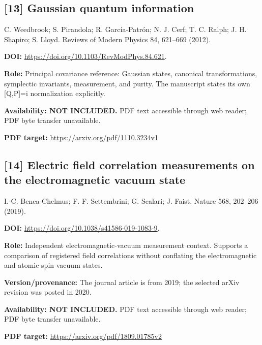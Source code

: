 \documentclass[11pt,a4paper]{article}
\begin{document}
\begin{minipage}{\textwidth}
\subsection*{[13] Gaussian quantum information}
C. Weedbrook; S. Pirandola; R. Garc\'ia-Patr\'on; N. J. Cerf; T. C. Ralph; J. H. Shapiro; S. Lloyd. Reviews of Modern Physics 84, 621--669 (2012).

\textbf{DOI:} \url{https://doi.org/10.1103/RevModPhys.84.621}.

\textbf{Role:} Principal covariance reference: Gaussian states, canonical transformations, symplectic invariants, measurement, and purity. The manuscript states its own [Q,P]=i normalization explicitly.

\textbf{Availability: NOT INCLUDED.} PDF text accessible through web reader; PDF byte transfer unavailable.\par
\textbf{PDF target:} \url{https://arxiv.org/pdf/1110.3234v1}
\end{minipage}
\par\medskip
\begin{minipage}{\textwidth}
\subsection*{[14] Electric field correlation measurements on the electromagnetic vacuum state}
I.-C. Benea-Chelmus; F. F. Settembrini; G. Scalari; J. Faist. Nature 568, 202--206 (2019).

\textbf{DOI:} \url{https://doi.org/10.1038/s41586-019-1083-9}.

\textbf{Role:} Independent electromagnetic-vacuum measurement context. Supports a comparison of registered field correlations without conflating the electromagnetic and atomic-spin vacuum states.

\textbf{Version/provenance:} The journal article is from 2019; the selected arXiv revision was posted in 2020.

\textbf{Availability: NOT INCLUDED.} PDF text accessible through web reader; PDF byte transfer unavailable.\par
\textbf{PDF target:} \url{https://arxiv.org/pdf/1809.01785v2}
\end{minipage}
\par\medskip
\end{document}
